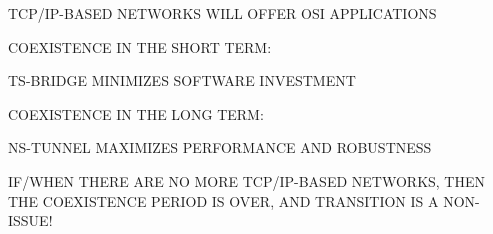 \begin{bwslide}

\begin{nrtc}
\item	TCP/IP-BASED NETWORKS WILL OFFER OSI APPLICATIONS

\item	COEXISTENCE IN THE SHORT TERM:
    \begin{nrtc}
    \item	TS-BRIDGE MINIMIZES SOFTWARE INVESTMENT
    \end{nrtc}

\item	COEXISTENCE IN THE LONG TERM:
    \begin{nrtc}
    \item	NS-TUNNEL MAXIMIZES PERFORMANCE AND ROBUSTNESS
    \end{nrtc}

\item	IF/WHEN THERE ARE NO MORE TCP/IP-BASED NETWORKS, THEN THE
	COEXISTENCE PERIOD IS OVER, AND TRANSITION IS A NON-ISSUE!
\end{nrtc}
\end{bwslide}
